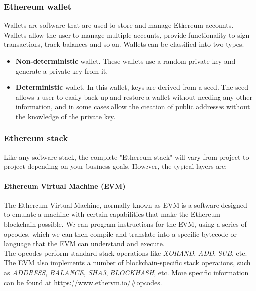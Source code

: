 \documentclass[a4paper, 12pt]{article} %
\begin{document}
        \subsubsection{Ethereum wallet}
            Wallets are software that are used to store and manage Ethereum accounts. Wallets allow the user to manage multiple accounts, provide functionality to sign transactions, track balances and so on. Wallets can be classified into two types.
            \begin{itemize}
                \item \textbf{Non-deterministic} wallet. These wallets use a random private key and generate a private key from it.
                \item \textbf{Deterministic} wallet. In this wallet, keys are derived from a seed. The seed allows a user to easily back up and restore a wallet without needing any other information, and in some cases allow the creation of public addresses without the knowledge of the private key.
            \end{itemize}
        
        \subsubsection{Ethereum stack}
            Like any software stack, the complete "Ethereum stack" will vary from project to project depending on your business goals. However, the typical layers are:
            \paragraph{Ethereum Virtual Machine (EVM)}
                The Ethereum Virtual Machine, normally known as EVM is a software designed to emulate a machine with certain capabilities that make the Ethereum blockchain possible. We can program instructions for the EVM, using a series of opcodes, which we can then compile and translate into a specific bytecode or language that the EVM can understand and execute.\\
                
                The opcodes perform standard stack operations like \textit{XORAND}, \textit{ADD}, \textit{SUB}, etc. The EVM also implements a number of blockchain-specific stack operations, such as \textit{ADDRESS}, \textit{BALANCE}, \textit{SHA3}, \textit{BLOCKHASH}, etc. More specific information can be found at \url{ https://www.ethervm.io/#opcodes}.\\
                
\end{document}
